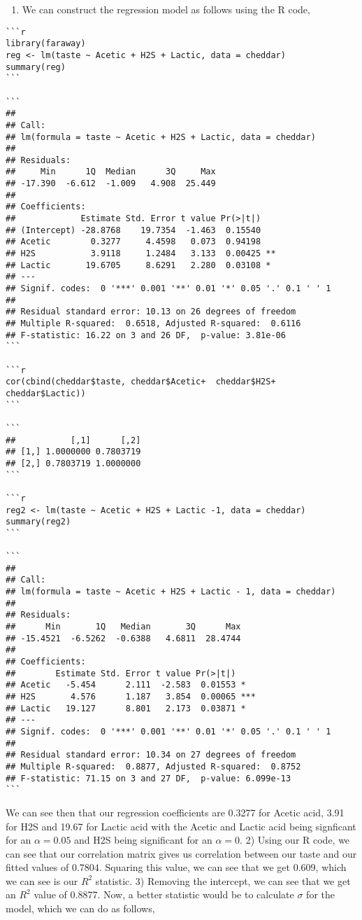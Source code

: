 \documentclass[
]{article}
\providecommand{\tightlist}{%
  \setlength{\itemsep}{0pt}\setlength{\parskip}{0pt}}
\begin{document}
\begin{enumerate}
\def\labelenumi{\arabic{enumi})}
\tightlist
\item
  We can construct the regression model as follows using the R code,
\end{enumerate}

\begin{verbatim}
```r
library(faraway)
reg <- lm(taste ~ Acetic + H2S + Lactic, data = cheddar)
summary(reg)
```

```
## 
## Call:
## lm(formula = taste ~ Acetic + H2S + Lactic, data = cheddar)
## 
## Residuals:
##     Min      1Q  Median      3Q     Max 
## -17.390  -6.612  -1.009   4.908  25.449 
## 
## Coefficients:
##             Estimate Std. Error t value Pr(>|t|)   
## (Intercept) -28.8768    19.7354  -1.463  0.15540   
## Acetic        0.3277     4.4598   0.073  0.94198   
## H2S           3.9118     1.2484   3.133  0.00425 **
## Lactic       19.6705     8.6291   2.280  0.03108 * 
## ---
## Signif. codes:  0 '***' 0.001 '**' 0.01 '*' 0.05 '.' 0.1 ' ' 1
## 
## Residual standard error: 10.13 on 26 degrees of freedom
## Multiple R-squared:  0.6518, Adjusted R-squared:  0.6116 
## F-statistic: 16.22 on 3 and 26 DF,  p-value: 3.81e-06
```

```r
cor(cbind(cheddar$taste, cheddar$Acetic+  cheddar$H2S+  cheddar$Lactic))
```

```
##           [,1]      [,2]
## [1,] 1.0000000 0.7803719
## [2,] 0.7803719 1.0000000
```

```r
reg2 <- lm(taste ~ Acetic + H2S + Lactic -1, data = cheddar)
summary(reg2)
```

```
## 
## Call:
## lm(formula = taste ~ Acetic + H2S + Lactic - 1, data = cheddar)
## 
## Residuals:
##      Min       1Q   Median       3Q      Max 
## -15.4521  -6.5262  -0.6388   4.6811  28.4744 
## 
## Coefficients:
##        Estimate Std. Error t value Pr(>|t|)    
## Acetic   -5.454      2.111  -2.583  0.01553 *  
## H2S       4.576      1.187   3.854  0.00065 ***
## Lactic   19.127      8.801   2.173  0.03871 *  
## ---
## Signif. codes:  0 '***' 0.001 '**' 0.01 '*' 0.05 '.' 0.1 ' ' 1
## 
## Residual standard error: 10.34 on 27 degrees of freedom
## Multiple R-squared:  0.8877, Adjusted R-squared:  0.8752 
## F-statistic: 71.15 on 3 and 27 DF,  p-value: 6.099e-13
```
\end{verbatim}

We can see then that our regression coefficients are 0.3277 for Acetic
acid, 3.91 for H2S and 19.67 for Lactic acid with the Acetic and Lactic
acid being signficant for an \(\alpha = 0.05\) and H2S being significant
for an \(\alpha = 0\). 2) Using our R code, we can see that our
correlation matrix gives us correlation between our taste and our fitted
values of \(0.7804\). Squaring this value, we can see that we get 0.609,
which we can see is our \(R^2\) statistic. 3) Removing the intercept, we
can see that we get an \(R^2\) value of 0.8877. Now, a better statistic
would be to calculate \(\sigma\) for the model, which we can do as
follows,
\end{document}
